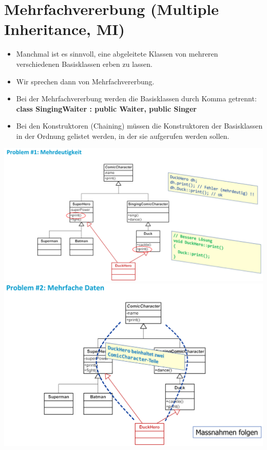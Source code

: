 \section{Mehrfachvererbung (Multiple Inheritance, MI)}
\begin{itemize}
	\item Manchmal ist es sinnvoll, eine abgeleitete Klassen von mehreren verschiedenen Basisklassen erben zu lassen.
	\item Wir sprechen dann von Mehrfachvererbung.
	\item Bei der Mehrfachvererbung werden die Basisklassen durch Komma getrennt:
	\subitem \textbf{class SingingWaiter : public Waiter, public Singer}
	\item Bei den Konstruktoren (Chaining) müssen die Konstruktoren der Basisklassen in der Ordnung gelistet werden, in der sie aufgerufen werden sollen.
\end{itemize}
\begin{multicols}{2}
	\includegraphics[width=\linewidth]{images/mehrdeutigkeit.png}
	\includegraphics[width=\linewidth]{images/mehrfacheDaten.png}
\end{multicols}
